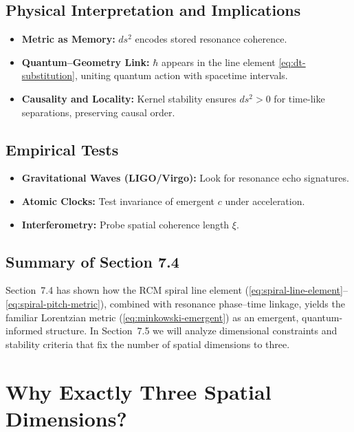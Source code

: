 \subsection{Physical Interpretation and Implications}
\label{sec:metric-interpretation}

\begin{itemize}
  \item \textbf{Metric as Memory:}  \(ds^2\) encodes stored resonance coherence.
  \item \textbf{Quantum–Geometry Link:}  \(\hbar\) appears in the line element \eqref{eq:dt-substitution}, uniting quantum action with spacetime intervals.
  \item \textbf{Causality and Locality:}  Kernel stability ensures \(ds^2>0\) for time-like separations, preserving causal order.
\end{itemize}

\subsection{Empirical Tests}
\label{sec:metric-tests}

\begin{itemize}
  \item \textbf{Gravitational Waves (LIGO/Virgo):}  Look for resonance echo signatures.
  \item \textbf{Atomic Clocks:}  Test invariance of emergent \(c\) under acceleration.
  \item \textbf{Interferometry:}  Probe spatial coherence length \(\xi\).
\end{itemize}

\subsection{Summary of Section 7.4}
\label{sec:metric-summary}

Section~7.4 has shown how the RCM spiral line element
(\ref{eq:spiral-line-element}–\ref{eq:spiral-pitch-metric}),
combined with resonance phase–time linkage, yields the familiar
Lorentzian metric (\ref{eq:minkowski-emergent}) as an emergent, quantum-informed structure.  In Section~7.5 we will analyze dimensional constraints and stability criteria that fix the number of spatial dimensions to three.


\section{Why Exactly Three Spatial Dimensions?}
\label{sec:three-dimensions}

